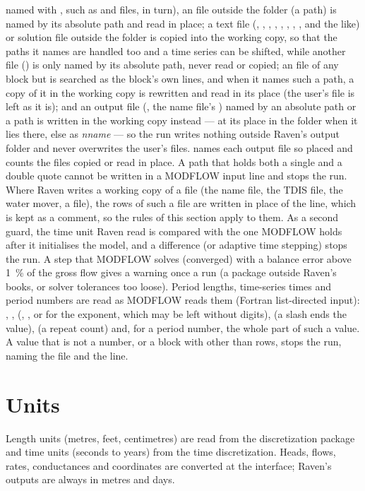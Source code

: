 named with , such as  and  files, in turn), an  file outside the folder (a
 path) is named by its absolute path and read in place; a text  file (, , ,
, , , , ,  and the like) or solution file outside the folder is
copied into the working copy, so that the paths it names are handled too and a time series can be shifted, while another
 file () is only named by its absolute path, never read or copied; an  file of any
block but  is searched as the block's own lines, and when it names such a path, a copy of it in the working copy
is rewritten and read in its place (the user's file is left as it is); and an output
file (, the name file's ) named by an absolute path or a  path is written in the working
copy instead --- at its place in the folder when it lies there, else as \emph{n}\cmd{\_}\emph{name} --- so
the run writes nothing outside Raven's output folder and never overwrites the user's files.  names
each output file so placed and counts the files copied or read in place. A path that holds both a single and a double
quote cannot be written in a MODFLOW input line and stops the run. Where Raven writes a
working copy of a file (the name file, the TDIS file, the water mover, a  file), the rows of such a file are
written in place of the line, which is kept as a comment, so the rules of this section apply to them. As a second
guard, the time unit Raven read is compared with the one MODFLOW holds after it initialises the model, and a difference
(or adaptive time stepping) stops the run. A step that MODFLOW solves (converged) with a balance error above 1~\% of the gross flow gives a warning
once a run (a package outside Raven's books, or solver tolerances too loose). Period lengths, time-series times and period
numbers are read as MODFLOW reads them (Fortran list-directed input): , ,  (,
,  or  for the exponent, which may be left without digits),  (a slash ends the value),
 (a repeat count) and, for a period number, the whole part of such a value. A value that is not a number, or a
 block with other than  rows, stops the run, naming the file and the line.

\section{Units}
Length units (metres, feet, centimetres) are read from the discretization package and time units (seconds to years) from
the time discretization. Heads, flows, rates, conductances and coordinates are converted at the interface; Raven's outputs
are always in metres and days.

